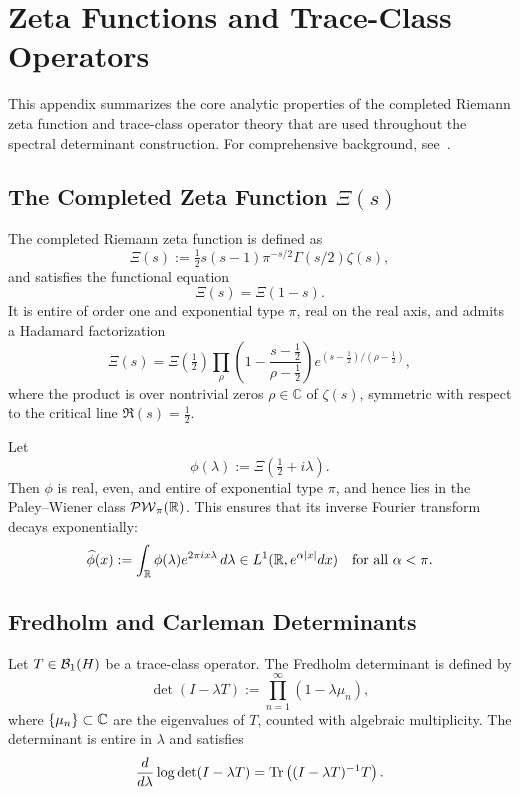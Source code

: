 \section{Zeta Functions and Trace-Class Operators}
\label{app:zeta_trace_background}

This appendix summarizes the core analytic properties of the completed Riemann zeta function and trace-class operator theory that are used throughout the spectral determinant construction. For comprehensive background, see~\cite{Titchmarsh1986Zeta, Simon2005TraceIdeals, Bornemann2010FredholmDeterminants}.

\subsection*{The Completed Zeta Function \( \Xi(s) \)}

The completed Riemann zeta function is defined as
\[
\Xi(s) := \tfrac{1}{2}s(s-1)\pi^{-s/2}\Gamma(s/2)\zeta(s),
\]
and satisfies the functional equation
\[
\Xi(s) = \Xi(1 - s).
\]
It is entire of order one and exponential type \( \pi \), real on the real axis, and admits a Hadamard factorization
\[
\Xi(s) = \Xi(\tfrac{1}{2}) \prod_{\rho} \left(1 - \frac{s - \tfrac{1}{2}}{\rho - \tfrac{1}{2}}\right) e^{(s - \tfrac{1}{2})/(\rho - \tfrac{1}{2})},
\]
where the product is over nontrivial zeros \( \rho \in \mathbb{C} \) of \( \zeta(s) \), symmetric with respect to the critical line \( \Re(s) = \tfrac{1}{2} \).

Let
\[
\phi(\lambda) := \Xi\left(\tfrac{1}{2} + i\lambda\right).
\]
Then \( \phi \) is real, even, and entire of exponential type \( \pi \), and hence lies in the Paley–Wiener class \( \mathcal{PW}_{\pi}(\mathbb{R}) \). This ensures that its inverse Fourier transform decays exponentially:
\[
\widehat{\phi}(x) := \int_{\mathbb{R}} \phi(\lambda)e^{2\pi i x \lambda} \, d\lambda
\in L^1(\mathbb{R}, e^{\alpha|x|}dx) \quad \text{for all } \alpha < \pi.
\]

\subsection*{Fredholm and Carleman Determinants}

Let \( T \in \mathcal{B}_1(H) \) be a trace-class operator. The Fredholm determinant is defined by
\[
\det(I - \lambda T) := \prod_{n=1}^\infty (1 - \lambda \mu_n),
\]
where \( \{ \mu_n \} \subset \mathbb{C} \) are the eigenvalues of \( T \), counted with algebraic multiplicity. The determinant is entire in \( \lambda \) and satisfies
\[
\frac{d}{d\lambda} \log \det(I - \lambda T) = \operatorname{Tr}\left((I - \lambda T)^{-1}T\right).
\]

